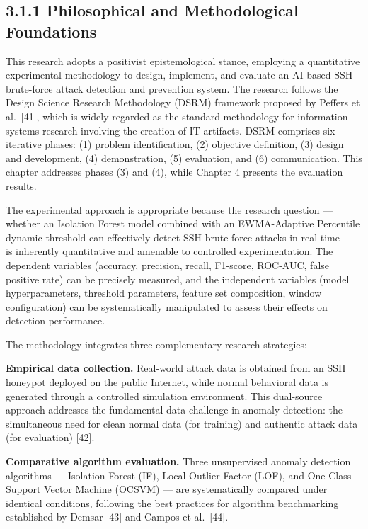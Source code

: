 \documentclass[
  a4paper]{report}
\begin{document}
\subsection{3.1.1 Philosophical and Methodological
Foundations}\label{philosophical-and-methodological-foundations}

This research adopts a positivist epistemological stance, employing a
quantitative experimental methodology to design, implement, and evaluate
an AI-based SSH brute-force attack detection and prevention system. The
research follows the Design Science Research Methodology (DSRM)
framework proposed by Peffers et al.~{[}41{]}, which is widely regarded
as the standard methodology for information systems research involving
the creation of IT artifacts. DSRM comprises six iterative phases: (1)
problem identification, (2) objective definition, (3) design and
development, (4) demonstration, (5) evaluation, and (6) communication.
This chapter addresses phases (3) and (4), while Chapter 4 presents the
evaluation results.

The experimental approach is appropriate because the research question
--- whether an Isolation Forest model combined with an EWMA-Adaptive
Percentile dynamic threshold can effectively detect SSH brute-force
attacks in real time --- is inherently quantitative and amenable to
controlled experimentation. The dependent variables (accuracy,
precision, recall, F1-score, ROC-AUC, false positive rate) can be
precisely measured, and the independent variables (model
hyperparameters, threshold parameters, feature set composition, window
configuration) can be systematically manipulated to assess their effects
on detection performance.

The methodology integrates three complementary research strategies:

\textbf{Empirical data collection.} Real-world attack data is obtained
from an SSH honeypot deployed on the public Internet, while normal
behavioral data is generated through a controlled simulation
environment. This dual-source approach addresses the fundamental data
challenge in anomaly detection: the simultaneous need for clean normal
data (for training) and authentic attack data (for evaluation) {[}42{]}.

\textbf{Comparative algorithm evaluation.} Three unsupervised anomaly
detection algorithms --- Isolation Forest (IF), Local Outlier Factor
(LOF), and One-Class Support Vector Machine (OCSVM) --- are
systematically compared under identical conditions, following the best
practices for algorithm benchmarking established by Demsar {[}43{]} and
Campos et al.~{[}44{]}.
\end{document}
